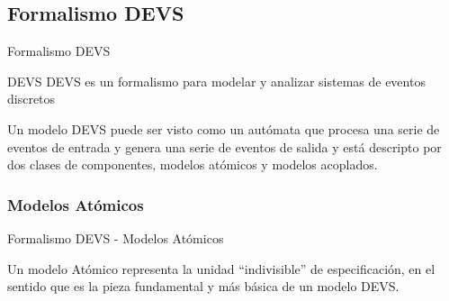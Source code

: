 \documentclass[10pt,handout]{beamer}
\newcommand{\quotes}[1]{``#1''}
\begin{document}
	\subsection{Formalismo DEVS}

\begin{frame}{Formalismo DEVS}
\begin{block}{DEVS}
	DEVS es un formalismo para modelar y analizar sistemas de eventos discretos 
\end{block}
\begin{block}{Un modelo DEVS}
 puede ser visto como un autómata que procesa una serie de eventos de entrada y genera una serie de eventos de salida y está descripto por dos clases de componentes, modelos atómicos y modelos acoplados.
\end{block}
\end{frame}
		\subsubsection{Modelos Atómicos}

\begin{frame}{Formalismo DEVS - Modelos Atómicos}
\begin{block}{Un modelo Atómico} 
	representa la unidad \quotes{indivisible} de especificación, en el sentido que es la pieza fundamental y más básica de un modelo DEVS. 
\end{block}
\end{frame}
\end{document}
